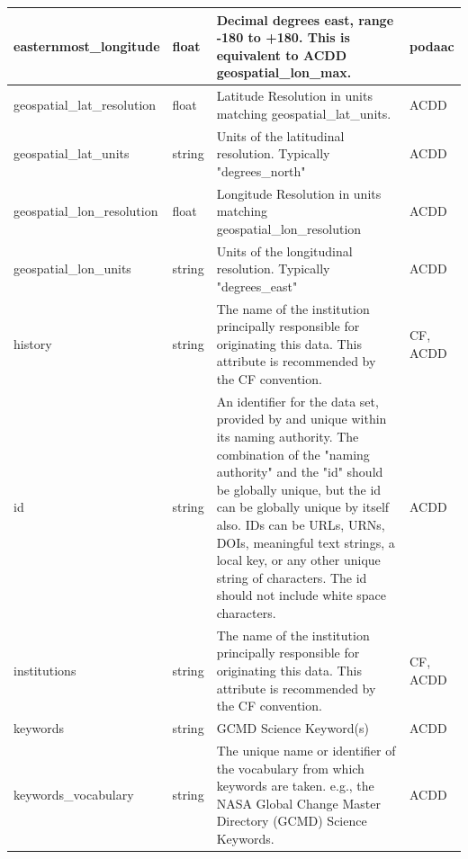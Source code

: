 \begin{longtable}{|p{}|p{}|p{}|p{}|}
\rowcolor{LightCyan} easternmost\_longitude & float & Decimal degrees east, range -180 to +180. This is equivalent to ACDD geospatial\_lon\_max. & podaac \\ \hline

\rowcolor{LightCyan} geospatial\_lat\_resolution & float & Latitude Resolution in units matching geospatial\_lat\_units. & ACDD \\ \hline

\rowcolor{LightCyan} geospatial\_lat\_units & string & Units of the latitudinal resolution. Typically "degrees\_north" & ACDD \\ \hline

\rowcolor{LightCyan} geospatial\_lon\_resolution & float & Longitude Resolution in units matching geospatial\_lon\_resolution & ACDD \\ \hline

\rowcolor{LightCyan} geospatial\_lon\_units & string & Units of the longitudinal resolution. Typically "degrees\_east" & ACDD \\ \hline

\rowcolor{LightCyan} history & string & The name of the institution principally responsible for originating this data. This attribute is recommended by the CF convention. & CF, ACDD \\ \hline

\rowcolor{LightCyan} id & string & An identifier for the data set, provided by and unique within its naming authority. The combination of the "naming authority" and the "id" should be globally unique, but the id can be globally unique by itself also. IDs can be URLs, URNs, DOIs, meaningful text strings, a local key, or any other unique string of characters. The id should not include white space characters. & ACDD \\ \hline

\rowcolor{LightCyan} institutions & string & The name of the institution principally responsible for originating this data. This attribute is recommended by the CF convention. & CF, ACDD \\ \hline

\rowcolor{LightCyan} keywords & string & GCMD Science Keyword(s) & ACDD \\ \hline

\rowcolor{LightCyan} keywords\_vocabulary & string & The unique name or identifier of the vocabulary from which keywords are taken. e.g., the NASA Global Change Master Directory (GCMD) Science Keywords. & ACDD \\ \hline


\end{longtable}
